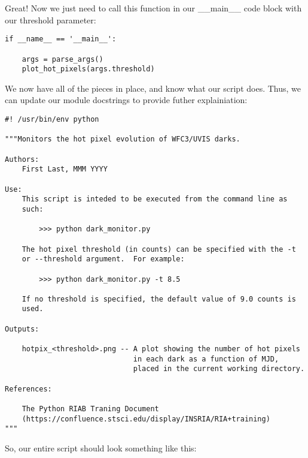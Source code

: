 Great! Now we just need to call this function in our {\sf\small \_\_main\_\_} code block with
our threshold parameter:

\begin{verbatim}
if __name__ == '__main__':

    args = parse_args()
    plot_hot_pixels(args.threshold)

\end{verbatim}

We now have all of the pieces in place, and know what our script does.  Thus, we can
update our module docstrings to provide futher explainiation:

\begin{verbatim}
#! /usr/bin/env python

"""Monitors the hot pixel evolution of WFC3/UVIS darks.

Authors:
    First Last, MMM YYYY

Use:
    This script is inteded to be executed from the command line as
    such:

        >>> python dark_monitor.py

    The hot pixel threshold (in counts) can be specified with the -t 
    or --threshold argument.  For example:

        >>> python dark_monitor.py -t 8.5

    If no threshold is specified, the default value of 9.0 counts is 
    used.

Outputs:

    hotpix_<threshold>.png -- A plot showing the number of hot pixels 
                              in each dark as a function of MJD, 
                              placed in the current working directory.

References:

    The Python RIAB Traning Document
    (https://confluence.stsci.edu/display/INSRIA/RIA+training)
"""
\end{verbatim}

So, our entire script should look something like this:

